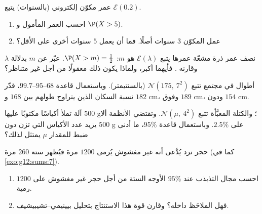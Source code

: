\begin{exercise}[$\star$]\label{exo:g12:contdist:3}
عمر مكوّن إلكتروني (بالسنوات) يتبع
$\mathcal E(0.2)$.
\begin{enumerate}
  \item احسب العمر المأمول و $\P(X > 5)$.
  \item عمل المكوّن $3$ سنوات أصلًا. فما 
        أن يعمل $5$ سنوات أخرى على الأقل؟
\end{enumerate}
\end{exercise}

\begin{exercise}[$\star\star$]\label{exo:g12:contdist:4}
نصف عمر ذرة مشعّة عمرها يتبع
$\mathcal E(\lambda)$ هو  $m$: $\P(X > m) = \frac12$. عبّر عن
$m$ بدلالة $\lambda$ وقارنه . فأيهما
أكبر، ولماذا يكون ذلك معقولًا من أجل  غير متناظر؟
\end{exercise}

\begin{exercise}[$\star\star$]\label{exo:g12:contdist:5}
أطوال في مجتمع تتبع $\mathcal N(175,\ 7^2)$ (بالسنتيمتر). وباستعمال
قاعدة $68$--$95$--$99.7$، قدّر نسبة السكان الذين يتراوح
طولهم بين $168$ و $182$ cm، وفوق $189$ cm، ودون $154$ cm.
\end{exercise}

\begin{exercise}[$\star\star$]\label{exo:g12:contdist:6}
آلة تملأ أكياسًا مكتوبًا عليها $500$ g؛ والكتلة المعبَّأة تتبع
$\mathcal N(\mu,\ 4^2)$. وتقتضي الأنظمة ألا يزيد عدد الأكياس التي
تزن دون $500$ g على $2.5\%$. وباستعمال قاعدة $95\%$، ما أدنى ضبط
للمقدار $\mu$ يمتثل لذلك؟
\end{exercise}

\begin{exercise}[$\star\star$]\label{exo:g12:contdist:7}
حجر نرد يُدَّعى أنه غير مغشوش يُرمى $1200$ مرة فيُظهر ستة $260$
مرة (كما في \cref{exo:g12:sums:7}).
\begin{enumerate}
  \item احسب مجال التذبذب عند $95\%$  الأوجه الستة
        من أجل حجر غير مغشوش على $1200$ رمية.
  \item فهل  الملاحَظ داخله؟ وقارن قوة هذا
        الاستنتاج بتحليل بيينيمي--تشيبيشيف.
\end{enumerate}
\end{exercise}

